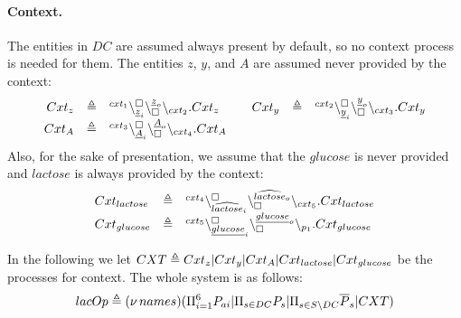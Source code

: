 \paragraph{Context.}
The entities in $DC$ are assumed always present by default, so no context process is needed for them.
The entities $z$, $y$, and $A$ are assumed never provided by the context:
\[
\begin{array}{rcl@{\qquad}rcl}
Cxt_{z}&\defeq & \startchain{cxt_1}\chainedlink{\underline{z}_i}{\noact}\chainedlink{\noact}{\underline{z}_o}\chainend{cxt_2}.Cxt_{z}
&
Cxt_{y}&\defeq & \startchain{cxt_2}\chainedlink{\underline{y}_i}{\noact}\chainedlink{\noact}{\underline{y}_o}\chainend{cxt_3}.Cxt_{y}
\\
Cxt_{A}&\defeq & \startchain{cxt_3}\chainedlink{\underline{A}_i}{\noact}\chainedlink{\noact}{\underline{A}_o}\chainend{cxt_4}.Cxt_{A} 
\end{array}
\]
 Also, for the sake of presentation, we assume that the $glucose$ is never provided and $lactose$ is always provided by the context:
\[
\begin{array}{lcl}
Cxt_{lactose}&\triangleq& {}^{cxt_4}\backslash_{\widehat{lactose}_i}^{\scriptstyle {\square}}\backslash_{\scriptstyle {\square}}^{\widehat{lactose}_o}\backslash_{cxt_5}.Cxt_{lactose}\\
Cxt_{glucose}&\triangleq & {}^{cxt_5}\backslash_{\underline{glucose}_i}^{\scriptstyle {\square}}\backslash_{\scriptstyle {\square}}^{\underline{glucose}_o}\backslash_{p_1}.Cxt_{glucose}
\end{array}
\]

\noindent
\noindent
In the following we let $CXT \triangleq Cxt_z | Cxt_y |Cxt_A | Cxt_{lactose} | Cxt_{glucose}$ be the processes for context. 
%
The whole system
is as follows: 
\[ lacOp \triangleq (\nu\, names) (\Pi_{i=1}^6 P_{ai} | \Pi_{s \in DC} P_s |   \Pi_{s \in S \backslash DC} \overline{P}_s| CXT)
\]

